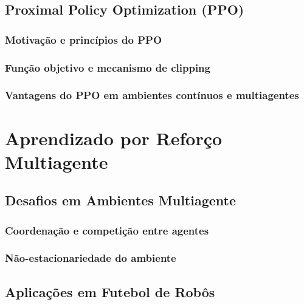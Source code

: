 \subsection{Proximal Policy Optimization (PPO)}
\label{subsec:ppo}

\subsubsection{Motivação e princípios do PPO}
\label{subsubsec:ppo_principios}

\subsubsection{Função objetivo e mecanismo de clipping}
\label{subsubsec:ppo_objetivo}

\subsubsection{Vantagens do PPO em ambientes contínuos e multiagentes}
\label{subsubsec:ppo_vantagens}

\section{Aprendizado por Reforço Multiagente}
\label{sec:marl}

\subsection{Desafios em Ambientes Multiagente}
\label{subsec:desafios_multi}

\subsubsection{Coordenação e competição entre agentes}
\label{subsubsec:coordenacao}

\subsubsection{Não-estacionariedade do ambiente}
\label{subsubsec:nao_estacionariedade}

\subsection{Aplicações em Futebol de Robôs}
\label{subsec:futebol_robos}

